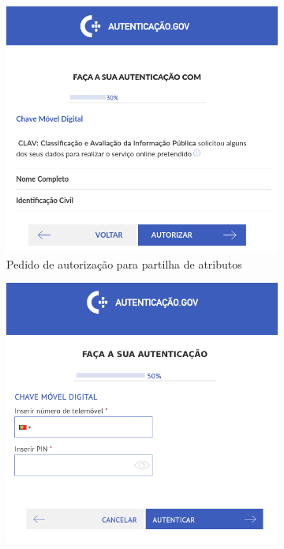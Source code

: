 \begin{figure}[H]
\centering
\begin{subfigure}{.32\textwidth}
    \begin{center}
        \includegraphics[width=1\linewidth]{img/CMDauto.png}
    \end{center}
    \caption{Pedido de autorização para partilha de atributos}
\end{subfigure}
\begin{subfigure}{.32\textwidth}
    \begin{center}
        \includegraphics[width=1\linewidth]{img/CMDcreds.png}

\end{center}
\end{subfigure}
\end{figure}
